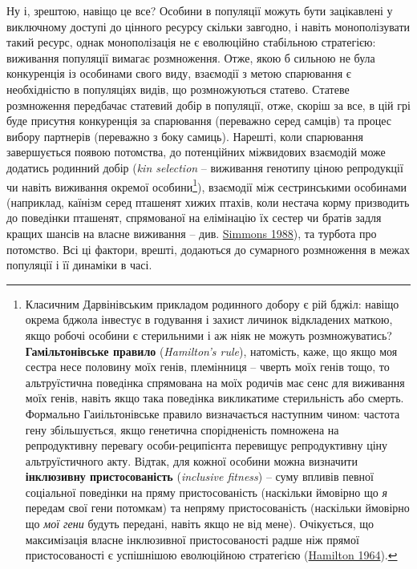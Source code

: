 \documentclass[
  11pt,
]{book}
\begin{document}
Ну і, зрештою, навіщо це все? Особини в популяції можуть бути зацікавлені у виключному доступі до цінного ресурсу скільки завгодно, і навіть монополізувати такий ресурс, однак монополізація не є еволюційно стабільною стратегією: виживання популяції вимагає розмноження. Отже, якою б сильною не була конкуренція із особинами свого виду, взаємодії з метою спарювання є необхідністю в популяціях видів, що розмножуються статево. Статеве розмноження передбачає статевий добір в популяції, отже, скоріш за все, в цій грі буде присутня конкуренція за спарювання (переважно серед самців) та процес вибору партнерів (переважно з боку самиць). Нарешті, коли спарювання завершується появою потомства, до потенційних міжвидових взаємодій може додатись родинний добір (\emph{kin selection} -- виживання генотипу ціною репродукції чи навіть виживання окремої особини\footnote{Класичним Дарвінівським прикладом родинного добору є рій бджіл: навіщо окрема бджола інвестує в годування і захист личинок відкладених маткою, якщо робочі особини є стерильними і аж ніяк не можуть розмножуватись? \textbf{Гамільтонівське правило} (\emph{Hamilton's rule}), натомість, каже, що якщо моя сестра несе половину моїх генів, племінниця -- чверть моїх генів тощо, то альтруїстична поведінка спрямована на моїх родичів має сенс для виживання моїх генів, навіть якщо така поведінка викликатиме стерильність або смерть. Формально Гаиільтонівське правило визначається наступним чином: частота гену збільшується, якщо генетична спорідненість помножена на репродуктивну перевагу особи-реципієнта перевищує репродуктивну ціну альтруїстичного акту. Відтак, для кожної особини можна визначити \textbf{інклюзивну пристосованість} (\emph{inclusive fitness}) -- суму впливів певної соціальної поведінки на пряму пристосованість (наскільки ймовірно що \emph{я} передам свої гени потомкам) та непряму пристосованість (наскільки ймовірно що \emph{мої гени} будуть передані, навіть якщо не від мене). Очікується, що максимізація власне інклюзивної пристосованості радше ніж прямої пристосованості є успішнішою еволюційною стратегією (\href{https://doi.org/10.1016/0022-5193(64)90038-4}{Hamilton 1964}).}), взаємодії між сестринськими особинами (наприклад, каїнізм серед пташенят хижих птахів, коли нестача корму призводить до поведінки пташенят, спрямованої на елімінацію їх сестер чи братів задля кращих шансів на власне виживання -- див. \href{https://doi.org/10.1111/j.1474-919X.1988.tb08809.x}{Simmons 1988}), та турбота про потомство. Всі ці фактори, врешті, додаються до сумарного розмноження в межах популяції і її динаміки в часі.
\end{document}
